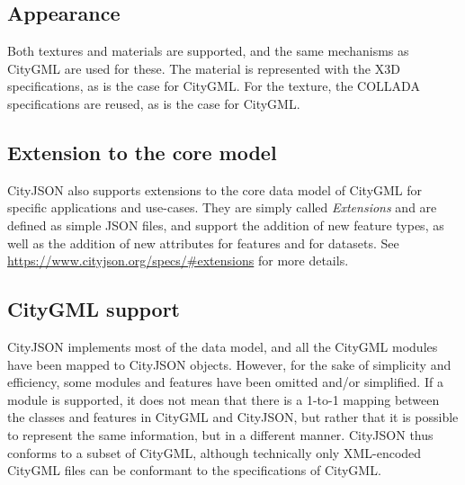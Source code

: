 \subsection{Appearance}

Both textures and materials are supported, and the same mechanisms as CityGML are used for these. 
The material is represented with the X3D specifications, as is the case for CityGML\@. 
For the texture, the COLLADA specifications are reused, as is the case for CityGML\@.


\subsection{Extension to the core model}

CityJSON also supports extensions to the core data model of CityGML for specific applications and use-cases.
They are simply called \emph{Extensions} and are defined as simple JSON files, and support the addition of new feature types, as well as the addition of new attributes for features and for datasets. 
See \url{https://www.cityjson.org/specs/#extensions} for more details.



\subsection{CityGML support}

CityJSON implements most of the data model, and all the CityGML modules have been mapped to CityJSON objects. 
However, for the sake of simplicity and efficiency, some modules and features have been omitted and/or simplified. 
If a module is supported, it does not mean that there is a 1-to-1 mapping between the classes and features in CityGML and CityJSON, but rather that it is possible to represent the same information, but in a different manner. 
CityJSON thus conforms to a subset of CityGML, although technically only XML-encoded CityGML files can be conformant to the specifications of CityGML\@.

%


